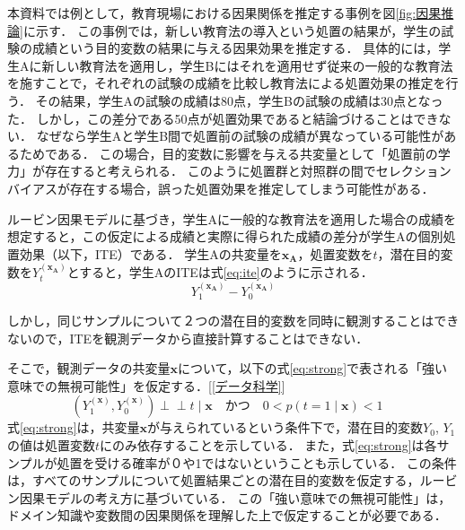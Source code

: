 \documentclass[dvipdfmx]{jreport}
\begin{document}
本資料では例として，教育現場における因果関係を推定する事例を図\ref{fig:因果推論}に示す．
この事例では，新しい教育法の導入という処置の結果が，学生の試験の成績という目的変数の結果に与える因果効果を推定する．
具体的には，学生Aに新しい教育法を適用し，学生Bにはそれを適用せず従来の一般的な教育法を施すことで，それぞれの試験の成績を比較し教育法による処置効果の推定を行う．
その結果，学生Aの試験の成績は80点，学生Bの試験の成績は30点となった．
しかし，この差分である50点が処置効果であると結論づけることはできない．
なぜなら学生Aと学生B間で処置前の試験の成績が異なっている可能性があるためである．
この場合，目的変数に影響を与える共変量として「処置前の学力」が存在すると考えられる．
このように処置群と対照群の間でセレクションバイアスが存在する場合，誤った処置効果を推定してしまう可能性がある．

ルービン因果モデルに基づき，学生Aに一般的な教育法を適用した場合の成績を想定すると，この仮定による成績と実際に得られた成績の差分が学生Aの個別処置効果（以下，ITE）である．
学生Aの共変量を$\boldsymbol{x_A}$，処置変数を$t$，潜在目的変数を$Y_t^{(\boldsymbol{x_A})}$とすると，学生AのITEは式\eqref{eq:ite}のように示される．
\begin{equation}
    Y_1^{(\boldsymbol{x_A})} - Y_0^{(\boldsymbol{x_A})} \label{eq:ite}
\end{equation}

しかし，同じサンプルについて２つの潜在目的変数を同時に観測することはできないので，ITEを観測データから直接計算することはできない．

そこで，観測データの共変量$\boldsymbol{x}$について，以下の式\eqref{eq:strong}で表される「強い意味での無視可能性」を仮定する．[\ref{データ科学}]
\begin{equation}
    (Y_1^{(\boldsymbol{x})}, Y_0^{(\boldsymbol{x})}) \perp\!\!\!\perp t \mid \boldsymbol{x} \quad \label{eq:strong}
    \text{かつ} \quad 0 < p(t = 1 \mid \boldsymbol{x}) < 1 \quad
\end{equation}
式\eqref{eq:strong}は，共変量$\boldsymbol{x}$が与えられているという条件下で，潜在目的変数$Y_0$, $Y_1$の値は処置変数$t$にのみ依存することを示している．
また，式\eqref{eq:strong}は各サンプルが処置を受ける確率が０や1ではないということも示している．
この条件は，すべてのサンプルについて処置結果ごとの潜在目的変数を仮定する，ルービン因果モデルの考え方に基づいている．
この「強い意味での無視可能性」は，ドメイン知識や変数間の因果関係を理解した上で仮定することが必要である．
\end{document}
